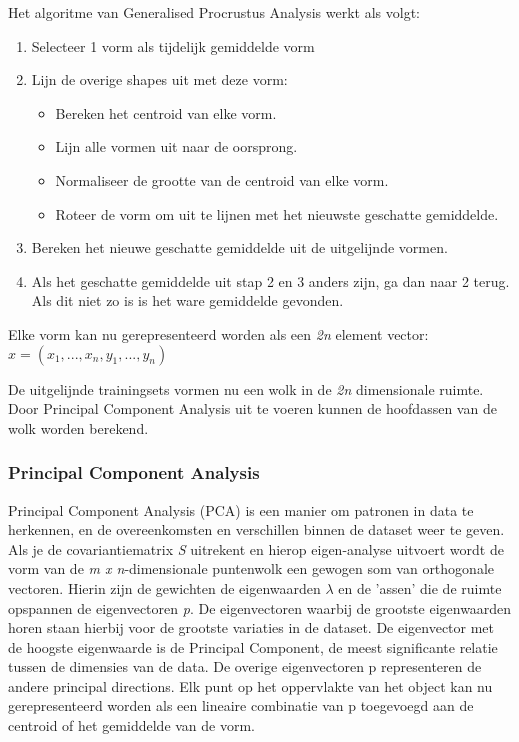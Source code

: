 Het algoritme van Generalised Procrustus Analysis werkt als volgt\cite{gpa}:
\begin{enumerate}
	\item Selecteer 1 vorm als tijdelijk gemiddelde vorm
	\item Lijn de overige shapes uit met deze vorm:
	\begin{itemize}
		\item Bereken het centroid van elke vorm.
		\item Lijn alle vormen uit naar de oorsprong.
		\item Normaliseer de grootte van de centroid van elke vorm.
		\item Roteer de vorm om uit te lijnen met het nieuwste geschatte gemiddelde.
	\end{itemize}
	\item Bereken het nieuwe geschatte gemiddelde uit de uitgelijnde vormen.
	\item Als het geschatte gemiddelde uit stap 2 en 3 anders zijn, ga dan naar 2 terug. Als dit niet zo is is het ware gemiddelde gevonden.
\end{enumerate}

Elke vorm kan nu gerepresenteerd worden als een \textit{2n} element vector:\
$x = (x_{1},...,x_{n},y_{1},...,y_{n})$ 

De uitgelijnde trainingsets vormen nu een wolk in de \textit{2n} dimensionale ruimte. Door Principal Component Analysis uit te voeren kunnen de hoofdassen van de wolk worden berekend.

\subsubsection{Principal Component Analysis}

Principal Component Analysis (PCA) is een manier om patronen in data te herkennen, en de overeenkomsten en verschillen binnen de dataset weer te geven.\cite{pca}
Als je de covariantiematrix \textit{S} uitrekent en hierop eigen-analyse uitvoert wordt de vorm van de \textit{m x n}-dimensionale puntenwolk een gewogen som van orthogonale vectoren. Hierin zijn de gewichten de eigenwaarden $\lambda$ en de 'assen' die de ruimte opspannen de eigenvectoren \textit{p}. 
De eigenvectoren waarbij de grootste eigenwaarden horen staan hierbij voor de grootste variaties in de dataset. 
De eigenvector met de hoogste eigenwaarde is de Principal Component, de meest significante relatie tussen de dimensies van de data. 
De overige eigenvectoren p representeren de andere principal directions. Elk punt op het oppervlakte van het object kan nu gerepresenteerd worden als een lineaire combinatie van p toegevoegd aan de centroid of het gemiddelde van de vorm.

